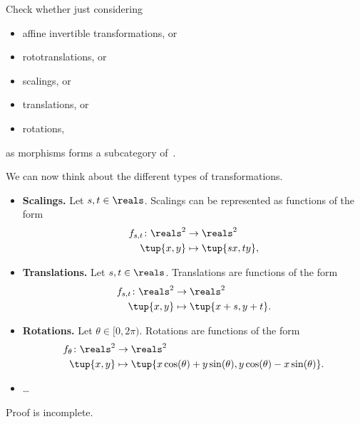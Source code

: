\begin{exercise}
    \label{ex:draw}
    Check whether just considering
    \begin{itemize}
        \item affine invertible transformations, or
        \item rototranslations, or
        \item scalings, or
        \item translations, or
        \item rotations,
    \end{itemize}
    as morphisms forms a subcategory of~\Draw.
\end{exercise}
\begin{solution}
    We can now think about the different types of transformations.
    \begin{itemize}
        \item \textbf{Scalings.}
              Let $s,t\in \reals$.
              Scalings can be represented as functions of the form
              \begin{equation*}
                  \begin{aligned}
                      f_{s,t}\colon \reals^2 & \to \reals^2 \\
                      \tup{x,y}              & \mapsto \tup{s x,t y},
                  \end{aligned}
              \end{equation*}
        \item \textbf{Translations.
              }
              Let $s,t\in \reals$.
              Translations are functions of the form
              \begin{equation*}
                  \begin{aligned}
                      f_{s,t}\colon \reals^2 & \to \reals^2 \\
                      \tup{x,y}              & \mapsto \tup{x+s,y+t}.
                  \end{aligned}
              \end{equation*}
        \item \textbf{Rotations.}
              Let $\theta \in [0,2\pi)$.
              Rotations are functions of the form
              \begin{equation*}
                  \begin{aligned}
                      f_{\theta}\colon \reals^2 & \to \reals^2 \\
                      \tup{x,y}                 & \mapsto \tup{x\cos(\theta)+y\sin(\theta), y\cos(\theta)-x\sin(\theta)}.
                  \end{aligned}
              \end{equation*}
        \item \dots

    \end{itemize}

    \begin{publictodo}
        Proof is incomplete.
    \end{publictodo}
\end{solution}

